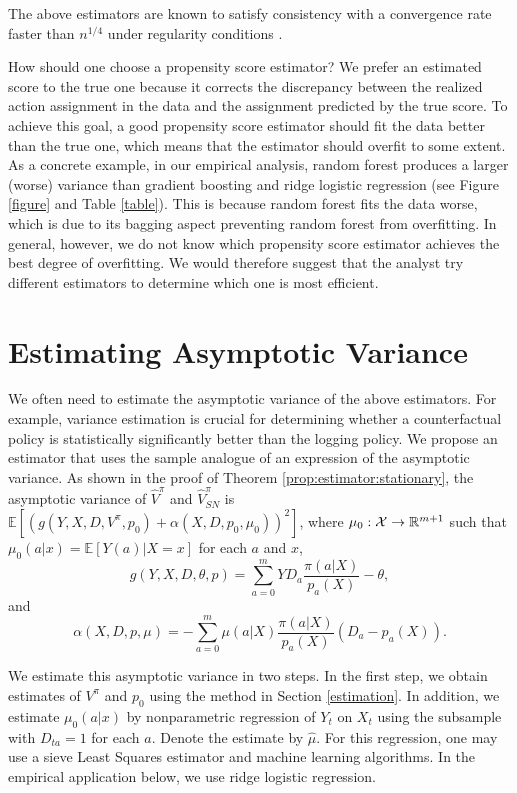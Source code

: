 \documentclass[letterpaper]{article} \usepackage{aaai19}  \usepackage{times}  \usepackage{helvet}  \usepackage{courier}  \usepackage{url}  \usepackage{graphicx}  \frenchspacing  \usepackage{comment}
\newcommand{\citep}{\cite}
\begin{document}
The above estimators are known to satisfy consistency with a convergence rate faster than $n^{1/4}$ under regularity conditions \citep{Newey1997,cattaneo2010efficient,knight2000asymptotics,blanchard2003rate,buhlmann2011statistics,wager2017estimation}. 

How should one choose a propensity score estimator?
We prefer an estimated score to the true one because it corrects the discrepancy between the realized action assignment in the data and the assignment predicted by the true score.
To achieve this goal, a good propensity score estimator should fit the data better than the true one, which means that the estimator should overfit to some extent.
As a concrete example, in our empirical analysis, random forest produces a larger (worse) variance than gradient boosting and ridge logistic regression (see Figure \ref{figure} and Table \ref{table}).
This is because random forest fits the data worse, which is due to its bagging aspect preventing random forest from overfitting.
In general, however, we do not know which propensity score estimator achieves the best degree of overfitting.
We would therefore suggest that the analyst try different estimators to determine which one is most efficient.




\section{Estimating Asymptotic Variance}\label{section:variance}
We often need to estimate the asymptotic variance of the above estimators. 
For example, variance estimation is crucial for determining whether a counterfactual policy is statistically significantly better than the logging policy. 
We propose an estimator that uses the sample analogue of an expression of the asymptotic variance.
As shown in the proof of Theorem \ref{prop:estimator:stationary}, the asymptotic variance of $\hat V^\pi$ and $\hat V^\pi_{SN}$ is $\mathbb{E}[(g(Y,X,D,V^\pi,p_0)+\alpha(X,D,p_0,\mu_0))^2]$, where $\mu_0:{\cal X}\rightarrow \mathbb{R}^{m+1}$ such that $\mu_0(a|x)=\mathbb{E}[Y(a)|X=x]$ for each $a$ and $x$,
$$
g(Y,X,D,\theta,p)=\sum_{a=0}^m YD_{a}\frac{\pi(a|X)}{p_{a}(X)}-\theta,
$$
and
$$
\alpha(X,D,p,\mu)=-\sum_{a=0}^m\mu(a|X)\frac{\pi(a|X)}{p_{a}(X)}(D_a-p_{a}(X)).
$$

We estimate this asymptotic variance in two steps.
In the first step, we obtain estimates of $V^\pi$ and $p_0$ using the method in Section \ref{estimation}.
In addition, we estimate $\mu_0(a|x)$ by nonparametric regression of $Y_t$ on $X_t$ using the subsample with $D_{ta}=1$ for each $a$.
Denote the estimate by $\hat \mu$.
For this regression, one may use a sieve Least Squares estimator and machine learning algorithms.
In the empirical application below, we use ridge logistic regression.
\end{document}
